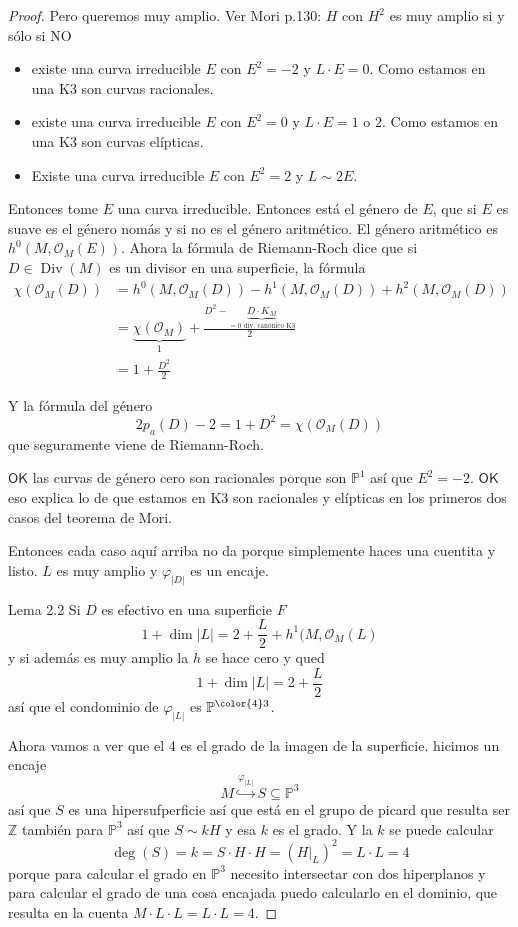 \begin{proof}
Pero queremos muy amplio. Ver Mori p.130: $H$ con  $H^2$ es muy amplio si y s\'olo si NO
\begin{itemize}
\item existe una curva irreducible $E$ con $E^2=-2$ y $L\cdot E=0$. Como estamos en una K3 son curvas racionales.
\item existe una curva irreducible $E$ con $E^2=0$ y $L\cdot E=1$ o $2$. Como estamos en una K3 son curvas elípticas.
\item Existe una curva irreducible  $E$ con $E^2=2$ y $L\sim 2E$.
\end{itemize}

Entonces tome $E$ una curva irreducible. Entonces  está el género de $E$, que si $E$ es suave es el género nomás y si no es el género aritmético. El género aritmético es $h^0(M,\mathcal{O}_M(E))$. Ahora la fórmula de Riemann-Roch dice que si $D\in\operatorname{Div}(M)$ es un divisor en una superficie, la fórmula
\begin{align*}
\chi(\mathcal{O}_M(D))&=h^0(M,\mathcal{O}_M(D))-h^1(M,\mathcal{O}_M(D))+h^2(M,\mathcal{O}_M(D))\\
&=\underbrace{\chi(\mathcal{O}_M)}_{1}+\frac{D^2-\underbrace{D\cdot K_M}_{=0\text{ div. canónico K3} }}{2}\\
&=1+\frac{D^2}{2}
\end{align*}

Y la fórmula del género
\[2 p_a(D)-2=1+D^2=\chi(\mathcal{O}_M(D))\]
que seguramente viene de Riemann-Roch.

$\mathsf{OK}$ las curvas de género cero son racionales porque son $\mathbb{P}^1$ así que $E^2=-2$. $\mathsf{OK}$ eso explica lo de que estamos en K3 son racionales y elípticas en los primeros dos casos del teorema de Mori.

Entonces cada caso aquí arriba no da porque simplemente haces una cuentita y listo. $L$ es muy amplio y  $\varphi_{|D|}$ es un encaje.

\begin{thing3}{Lema 2.2}\leavevmode
	Si $D$ es efectivo en una superficie $F$ 
	\[1+\dim |L|=2+ \frac{L}{2}+h^1(M,\mathcal{O}_M(L)\]
	y si además es muy amplio la $h$ se hace cero y qued
	\[1+\dim |L|=2+ \frac{L}{2}\]
	así que el condominio de $\varphi_{|L|}$ es $\mathbb{P}^{\text{{\color{4}$3$}} }$.
\end{thing3}

Ahora vamos a ver que el 4 es el grado de la imagen de la superficie.
hicimos un encaje
\[M\overset{\varphi_{|L|}}{\hookrightarrow }S\subseteq \mathbb{P}^3\]
así que $S$ es una hipersufperficie así que está en el grupo de picard que resulta ser $\mathbb{Z}$ también para $\mathbb{P}^3$ así que $S \sim kH$ y esa $k$ es el grado. Y la $k$ se puede calcular
\[\operatorname{deg}(S)=k=S\cdot H\cdot H=(H|_{L})^2=L\cdot L=4\]
porque para calcular el grado en $\mathbb{P}^3$ necesito intersectar con dos hiperplanos y para calcular el grado de una  cosa encajada puedo calcularlo en el dominio, que resulta en la cuenta $M\cdot L\cdot L=L\cdot L=4$.


\end{proof}
